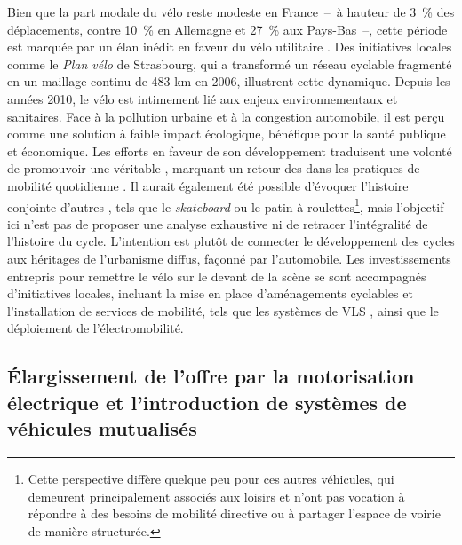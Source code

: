 \begin{refsegment}
Bien que la part modale du vélo reste modeste en France~–~à hauteur de 3~\% des déplacements, contre 10~\% en Allemagne et 27~\% aux Pays-Bas~–, cette période est marquée par un élan inédit en faveur du vélo utilitaire \textcolor{blue}{\autocite[222]{dauncey_french_2012}}. Des initiatives locales comme le \textsl{Plan vélo} de Strasbourg, qui a transformé un réseau cyclable fragmenté en un maillage continu de 483 km en 2006, illustrent cette dynamique. Depuis les années 2010, le vélo est intimement lié aux enjeux environnementaux et sanitaires. Face à la pollution urbaine et à la congestion automobile, il est perçu comme une solution à faible impact écologique, bénéfique pour la santé publique et économique. Les efforts en faveur de son développement traduisent une volonté de promouvoir une véritable  \textcolor{blue}{\autocites[4]{sebban_complementarite_2003}{heran_transition_2018}}, marquant un retour des  dans les pratiques de mobilité quotidienne \textcolor{blue}{\autocite[35]{papon_retour_2012}}. Il aurait également été possible d’évoquer l’histoire conjointe d’autres , tels que le \textsl{skateboard} ou le patin à roulettes\footnote{
    Cette perspective diffère quelque peu pour ces autres véhicules, qui demeurent principalement associés aux loisirs et n’ont pas vocation à répondre à des besoins de mobilité directive ou à partager l’espace de voirie de manière structurée.
}, mais l’objectif ici n’est pas de proposer une analyse exhaustive ni de retracer l’intégralité de l’histoire du cycle. L’intention est plutôt de connecter le développement des cycles aux héritages de l'urbanisme diffus, façonné par l’automobile. Les investissements entrepris pour remettre le vélo sur le devant de la scène se sont accompagnés d'initiatives locales, incluant la mise en place d'aménagements cyclables et l'installation de services de mobilité, tels que les systèmes de \acrshort{VLS} \textcolor{blue}{\autocite[244]{dauncey_french_2012}}, ainsi que le déploiement de l'électromobilité.%

\subsection{Élargissement de l’offre par la motorisation électrique et l’introduction de systèmes de véhicules mutualisés
    \label{chap1:velo-micromobilite-innovations}
    }


\end{refsegment}
